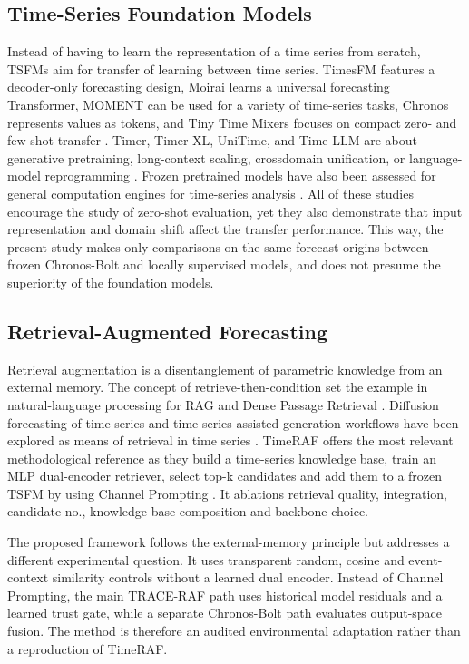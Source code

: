 \documentclass{ieeeaccess}
\begin{document}
\subsection{Time-Series Foundation Models}
Instead of having to learn the representation of a time series from scratch, TSFMs aim for transfer of learning between time series. TimesFM features a decoder-only forecasting design, Moirai learns a universal forecasting Transformer, MOMENT can be used for a variety of time-series tasks, Chronos represents values as tokens, and Tiny Time Mixers focuses on compact zero- and few-shot transfer \cite{das2024timesfm,woo2024moirai,goswami2024moment,ansari2024chronos,ekambaram2024ttm}. Timer, Timer-XL, UniTime, and Time-LLM are about generative pretraining, long-context scaling, crossdomain unification, or language-model reprogramming \cite{liu2024timer,liu2025timerxl,liu2024unitime,jin2024timellm}. Frozen pretrained models have also been assessed for general computation engines for time-series analysis \cite{zhou2023onefitsall}. All of these studies encourage the study of zero-shot evaluation, yet they also demonstrate that input representation and domain shift affect the transfer performance. This way, the present study makes only comparisons on the same forecast origins between frozen Chronos-Bolt and locally supervised models, and does not presume the superiority of the foundation models.

\subsection{Retrieval-Augmented Forecasting}
Retrieval augmentation is a disentanglement of parametric knowledge from an external memory. The concept of retrieve-then-condition set the example in natural-language processing for RAG and Dense Passage Retrieval \cite{lewis2020rag,karpukhin2020dpr}. Diffusion forecasting of time series and time series assisted generation workflows have been explored as means of retrieval in time series \cite{liu2024ratd,ang2024tsgassist}. TimeRAF offers the most relevant methodological reference as they build a time-series knowledge base, train an MLP dual-encoder retriever, select top-k candidates and add them to a frozen TSFM by using Channel Prompting \cite{zhang2025timeraf}. It ablations retrieval quality, integration, candidate no., knowledge-base composition and backbone choice.

The proposed framework follows the external-memory principle but addresses a different experimental question. It uses transparent random, cosine and event-context similarity controls without a learned dual encoder. Instead of Channel Prompting, the main TRACE-RAF path uses historical model residuals and a learned trust gate, while a separate Chronos-Bolt path evaluates output-space fusion. The method is therefore an audited environmental adaptation rather than a reproduction of TimeRAF.
\end{document}
